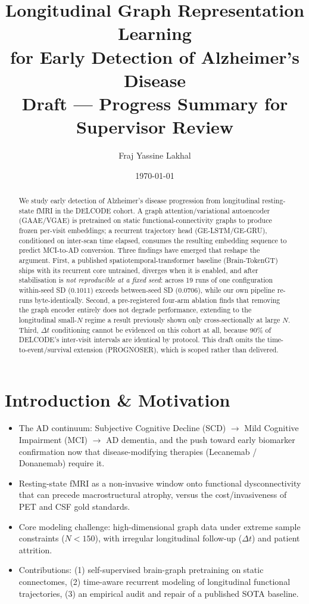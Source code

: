 \documentclass[11pt,a4paper]{article}
\title{Longitudinal Graph Representation Learning\\
  for Early Detection of Alzheimer's Disease\\[0.3em]
  \large Draft --- Progress Summary for Supervisor Review}
\author{Fraj Yassine Lakhal}
\date{\today}
\begin{document}
\maketitle

\begin{abstract}
We study early detection of Alzheimer's disease progression from longitudinal
resting-state fMRI in the DELCODE cohort. A graph attention/variational
autoencoder (GAAE/VGAE) is pretrained on static functional-connectivity graphs
to produce frozen per-visit embeddings; a recurrent trajectory head
(GE-LSTM/GE-GRU), conditioned on inter-scan time elapsed, consumes the
resulting embedding sequence to predict MCI-to-AD conversion. Three findings
have emerged that reshape the argument. First, a published
spatiotemporal-transformer baseline (Brain-TokenGT) ships with its recurrent
core untrained, diverges when it is enabled, and after stabilisation is
\emph{not reproducible at a fixed seed}: across 19 runs of one configuration
within-seed SD ($0.1011$) exceeds between-seed SD ($0.0706$), while our own
pipeline re-runs byte-identically. Second, a pre-registered four-arm ablation
finds that removing the graph encoder entirely does not degrade performance,
extending to the longitudinal small-$N$ regime a result previously shown only
cross-sectionally at large $N$. Third, $\Delta t$ conditioning cannot be
evidenced on this cohort at all, because 90\% of DELCODE's inter-visit
intervals are identical by protocol. This draft omits the
time-to-event/survival extension (PROGNOSER), which is scoped rather than
delivered.
\end{abstract}

\section{Introduction \& Motivation}
\begin{itemize}
  \item The AD continuum: Subjective Cognitive Decline (SCD) $\to$ Mild
    Cognitive Impairment (MCI) $\to$ AD dementia, and the push toward early
    biomarker confirmation now that disease-modifying therapies (Lecanemab /
    Donanemab) require it.
  \item Resting-state fMRI as a non-invasive window onto functional
    dysconnectivity that can precede macrostructural atrophy, versus the
    cost/invasiveness of PET and CSF gold standards.
  \item Core modeling challenge: high-dimensional graph data under extreme
    sample constraints ($N < 150$), with irregular longitudinal follow-up
    ($\Delta t$) and patient attrition.
  \item Contributions: (1) self-supervised brain-graph pretraining on static
    connectomes, (2) time-aware recurrent modeling of longitudinal functional
    trajectories, (3) an empirical audit and repair of a published SOTA
    baseline.
\end{itemize}
\end{document}
